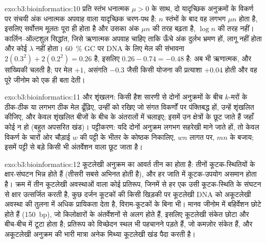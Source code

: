 \begin{solution}{exo:b3:bioinformatics:10}
प्रति स्तंभ धनात्मक  $\mu > 0$ के साथ, दो यादृच्छिक
अनुक्रमों के विकर्ण पर संचयी अंक धनात्मक अपवाह वाला यादृच्छिक चरण-पथ
है: $n$ स्तंभों के बाद वह लगभग $\mu n$ होता है, इसलिए सर्वोत्तम
 मूलतः पूरा ही होता है और उसका अंक $\mu n$ की तरह बढ़ता
है, $\log n$ की तरह नहीं। कार्लिन--ऑल्टशुल सिद्धांत, जिसे ऋणात्मक अपवाह
चाहिए ताकि ऊँचे अंक दुर्लभ भ्रमण हों, लागू नहीं होता और कोई $\lambda$
नहीं होता। \qty{60}{\%} GC पर DNA के लिए मेल की
संभावना $2(0.3^{2}) + 2(0.2^{2}) = 0.26$ है, इसलिए 
$0.26 - 0.74 = -0.48$ है: अब भी ऋणात्मक, और सांख्यिकी चलती
है; पर मेल $+1$, असंगति $-0.3$ जैसी किसी योजना की प्रत्याशा
$+0.04$ होती और वह पूरे जीनोम को एक ही  बता देती।
\end{solution}

\begin{solution}{exo:b3:bioinformatics:11}
 और शृंखलन: किसी हैश सारणी से दोनों अनुक्रमों के बीच $k$-मरों के
ठीक-ठीक या लगभग ठीक मेल ढूँढ़िए, उन्हीं को रखिए जो संगत विकर्णों पर
पंक्तिबद्ध हों, उन्हें शृंखलित कीजिए, और  केवल शृंखलित
बीजों के बीच के अंतरालों में चलाइए; इसमें उन क्षेत्रों के  छूट
जाते हैं जहाँ कोई  न हो (बहुत अपसरित खंड)। पट्टीकरण: यदि दोनों
अनुक्रम लगभग सहरेखी माने जाते हों, तो केवल विकर्ण के चारों ओर चौड़ाई
$w$ की पट्टी के भीतर के कोष्ठक निकालिए, $wn$ लागत पर, $mn$ के बजाय;
इसमें पट्टी से बड़े किसी भी अंतर्वेशन वाला  छूट जाता है।
\end{solution}

\begin{solution}{exo:b3:bioinformatics:12}
कूटलेखी अनुक्रम का आवर्त तीन का होता है: तीनों कूटक-स्थितियों के
क्षार-संघटन भिन्न होते हैं (तीसरी सबसे अभिनत होती है), और हर जाति में
कूटक-उपयोग असमान होता है। क्रम में तीन कूटलेखी अवस्थाओं वाला कोई
प्रतिरूप, जिनमें से हर एक उसी कूटक-स्थिति के संघटन से क्षार उत्सर्जित
करती है, कुछ दर्जन कूटकों की किसी खिड़की पर कूटलेखी DNA को अकूटलेखी
अवस्था की तुलना में अधिक प्रायिकता देता है, विराम-कूटकों के बिना भी।
मानव जीनोम में बहिर्वेशन छोटे होते हैं (\qty{150}{bp}), जो किलोक्षारों
के अंतर्वेशनों से अलग होते हैं, इसलिए कूटलेखी संकेत छोटा और बीच-बीच में
टूटा होता है; प्रतिरूप को विच्छेदन स्थल भी पहचानने पड़ते हैं, जो कमज़ोर
संकेत हैं, और अकूटलेखी अनुक्रम की भारी मात्रा अनेक मिथ्या कूटलेखी खंड
पैदा करती है।
\end{solution}

